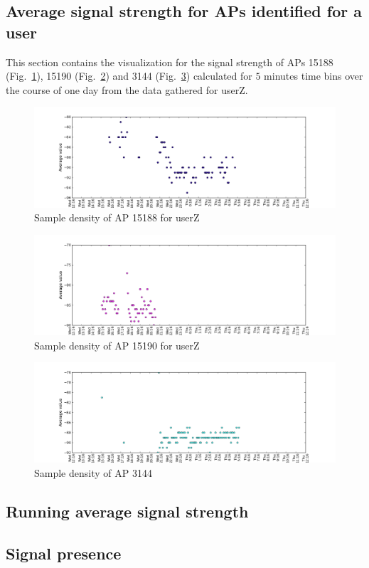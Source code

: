\subsection{Average signal strength for APs identified for a user}
\label{appendix_avg_signal}

This section contains the visualization for the signal strength of APs 15188
(Fig.~\ref{avg_6_2nd_day_1}), 15190 (Fig.~\ref{avg_6_2nd_day_2}) and 3144
(Fig.~\ref{avg_6_2nd_day_3}) calculated for $5$ minutes time bins over the
course of one day from the data gathered for userZ.

\begin{figure}[h]
\centering
\includegraphics[width =\textwidth]{figures/combinations/user_6_sorted_1days_plot_15188_avg_sig.png}
\caption{Sample density of AP 15188 for userZ}
\label{avg_6_2nd_day_1}
\end{figure}

\begin{figure}[h]
\centering
\includegraphics[width =\textwidth]{figures/combinations/user_6_sorted_1days_plot_15190_avg_sig.png}
\caption{Sample density of AP 15190 for userZ}
\label{avg_6_2nd_day_2}
\end{figure}

\begin{figure}[h]
\centering
\includegraphics[width =\textwidth]{figures/combinations/user_6_sorted_1days_plot_3144_avg_sig.png}
\caption{Sample density of AP 3144}
\label{avg_6_2nd_day_3}
\end{figure}

\subsection{Running average signal strength}
\subsection{Signal presence}